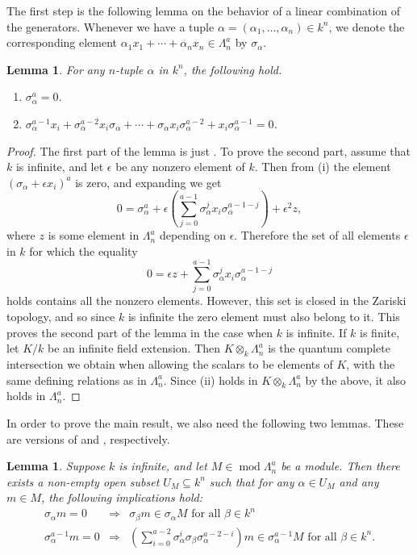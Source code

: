 \documentclass[a4paper]{amsart}
\newtheorem{lemma}[theorem]{Lemma}
\theoremstyle{definition}
\theoremstyle{definition}
\theoremstyle{definition}
\theoremstyle{definition}
\theoremstyle{definition}
\theoremstyle{definition}
\theoremstyle{remark}
\theoremstyle{remark}
\theoremstyle{definition}
\theoremstyle{definition}
\begin{document}
The first step is the following lemma on the behavior of a linear
combination of the generators. Whenever we have a tuple $\alpha = (
\alpha_1, \dots, \alpha_n ) \in k^n$, we denote the corresponding
element $\alpha_1 x_1 + \cdots + \alpha_n x_n \in \Lambda^a_n$ by
$\sigma_{\alpha}$.

\begin{lemma}\label{lincomb}
For any $n$-tuple $\alpha$ in $k^n$, the following hold.
\begin{enumerate}
\item[(i)] $\sigma_{\alpha}^a =0$.
\item[(ii)] $\sigma_{\alpha}^{a-1}x_i +
\sigma_{\alpha}^{a-2}x_i \sigma_{\alpha} + \cdots + \sigma_{\alpha}
x_i \sigma_{\alpha}^{a-2} + x_i \sigma_{\alpha}^{a-1} =0$.
\end{enumerate}
\end{lemma}

\begin{proof}
The first part of the lemma is just \cite[Lemma 2.3]{Benson}. To
prove the second part, assume that $k$ is infinite, and let
$\epsilon$ be any nonzero element of $k$. Then from (i) the element
$( \sigma_{\alpha} + \epsilon x_i )^a$ is zero, and expanding we get
$$0 = \sigma_{\alpha}^a + \epsilon \left ( \sum_{j=0}^{a-1} \sigma_{\alpha}^j
x_i \sigma_{\alpha}^{a-1-j} \right ) + \epsilon^2 z,$$ where $z$ is
some element in $\Lambda_n^a$ depending on $\epsilon$. Therefore the
set of all elements $\epsilon$ in $k$ for which the equality
$$0 = \epsilon z + \sum_{j=0}^{a-1} \sigma_{\alpha}^j x_i
\sigma_{\alpha}^{a-1-j}$$ holds contains all the nonzero elements.
However, this set is closed in the Zariski topology, and so since
$k$ is infinite the zero element must also belong to it. This proves
the second part of the lemma in the case when $k$ is infinite. If
$k$ is finite, let $K / k$ be an infinite field extension. Then $K
\otimes_k \Lambda_n^a$ is the quantum complete intersection we
obtain when allowing the scalars to be elements of $K$, with the
same defining relations as in $\Lambda_n^a$. Since (ii) holds in $K
\otimes_k \Lambda_n^a$ by the above, it also holds in $\Lambda_n^a$.
\end{proof}

In order to prove the main result, we also need the following two
lemmas. These are versions of \cite[Lemma 9]{Oppermann1} and
\cite[Proposition 11]{Oppermann1}, respectively.

\begin{lemma}\label{openset}
Suppose $k$ is infinite, and let $M \in {\operatorname{mod}\nolimits} \Lambda^a_n$ be a
module. Then there exists a non-empty open subset $U_M \subseteq
k^n$ such that for any $\alpha \in U_M$ and any $m \in M$, the
following implications hold:
\begin{eqnarray*}
\sigma_{\alpha} m =0 & \Rightarrow & \sigma_{\beta} m \in
\sigma_{\alpha} M \text{ for all } \beta \in k^n \\
\sigma_{\alpha}^{a-1} m =0 & \Rightarrow & \left ( \sum_{i=0}^{a-2}
\sigma_{\alpha}^i \sigma_{\beta} \sigma_{\alpha}^{a-2-i} \right ) m
\in \sigma_{\alpha}^{a-1} M \text{ for all } \beta \in k^n.
\end{eqnarray*}
\end{lemma}
\end{document}
